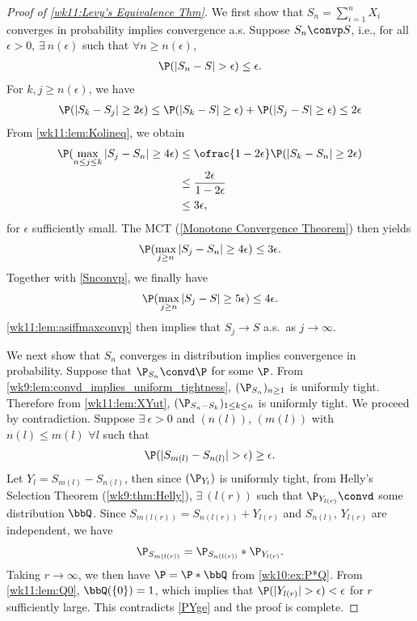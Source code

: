 \documentclass[../aipt.tex]{subfiles}
\begin{document}
\begin{proof}[Proof of \cref{wk11:Levy's Equivalence Thm}]
We first show that $S_n=\sum_{i=1}^n X_i$ converges in probability implies convergence a.s. Suppose $S_n \convp S$, i.e., for all $\epsilon >0$, $\exists\ n(\epsilon)$ such that $\forall n\geq n(\epsilon)$,
\begin{align}\label{Snconvp}
\P(|S_n-S|>\epsilon) \leq \epsilon.
\end{align}
For $k,j\geq n(\epsilon)$, we have
\begin{align*}
\P(|S_k-S_j|\geq 2\epsilon) \leq \P(|S_k-S|\geq\epsilon) +\P(|S_j-S|\geq\epsilon) \leq 2\epsilon
\end{align*}
From \cref{wk11:lem:Kolineq}, we obtain
\begin{align*}
\P(\max_{n\leq j \leq k} |S_j-S_n| \geq 4\epsilon)
&\leq \ofrac{1-2\epsilon} \P(|S_k - S_n|\geq 2\epsilon)\\
&\leq \frac{2\epsilon}{1-2\epsilon}\\
&\leq 3\epsilon,
\end{align*}
for $\epsilon$ sufficiently small. The MCT (\cref{Monotone Convergence Theorem}) then yields
\begin{align*}
\P(\max_{j \geq n} |S_j-S_n| \geq 4\epsilon) \leq 3\epsilon.
\end{align*}
Together with \cref{Snconvp}, we finally have
\begin{align*}
\P(\max_{j \geq n} |S_j-S| \geq 5\epsilon) \leq 4\epsilon.
\end{align*} 
\cref{wk11:lem:asiffmaxconvp} then implies that $S_j \to S$ a.s.\ as $j\to\infty$.

We next show that $S_n$ converges in distribution implies convergence in probability. Suppose that $\P_{S_n} \convd \P$ for some $\P$. From \cref{wk9:lem:convd_implies_uniform_tightness}, $(\P_{S_n})_{n\geq1}$ is uniformly tight. Therefore from \cref{wk11:lem:XYut}, $(\P_{S_n-S_k})_{1\leq k\leq n}$ is uniformly tight. We proceed by contradiction. Suppose $\exists\ \epsilon>0$ and $(n(l))$, $(m(l))$ with $n(l)\leq m(l)$ $\forall l$ such that
\begin{align}\label{PYge}
\P(|S_{m(l)}-S_{n(l)}|>\epsilon) \geq \epsilon.
\end{align}
Let $Y_l=S_{m(l)}-S_{n(l)}$, then since $(\P_{Y_l})$ is uniformly tight, from Helly's Selection Theorem (\cref{wk9:thm:Helly}), $\exists\ (l(r))$ such that $\P_{Y_{l(r)}} \convd$ some distribution $\bbQ$. Since $S_{m(l(r))}=S_{n(l(r))}+Y_{l(r)}$ and $S_{n(l)}$, $Y_{l(r)}$ are independent, we have
\begin{align*}
\P_{S_{m(l(r))}} = \P_{S_{n(l(r))}}*\P_{Y_{l(r)}}.
\end{align*}
Taking $r\to\infty$, we then have $\P = \P*\bbQ$ from \cref{wk10:ex:P*Q}. From \cref{wk11:lem:Q0}, $\bbQ(\{0\})=1$, which implies that $\P(|Y_{l(r)}|>\epsilon) <\epsilon$ for $r$ sufficiently large. This contradicts \cref{PYge} and the proof is complete.
\end{proof}
\end{document}
